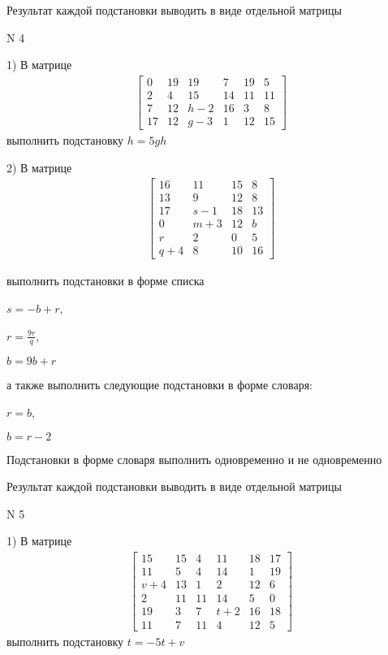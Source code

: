 \documentclass[11pt]{report}
\begin{document}
    Результат каждой подстановки выводить в виде отдельной матрицы

\newpage
N 4


    1) В матрице
\begin{align*}
\left[\begin{matrix}0 & 19 & 19 & 7 & 19 & 5\\2 & 4 & 15 & 14 & 11 & 11\\7 & 12 & h - 2 & 16 & 3 & 8\\17 & 12 & g - 3 & 1 & 12 & 15\end{matrix}\right]
\end{align*}
выполнить подстановку $h=5 g h$


    2) В матрице
\begin{align*}
\left[\begin{matrix}16 & 11 & 15 & 8\\13 & 9 & 12 & 8\\17 & s - 1 & 18 & 13\\0 & m + 3 & 12 & b\\r & 2 & 0 & 5\\q + 4 & 8 & 10 & 16\end{matrix}\right]
\end{align*}

выполнить подстановки в форме списка

$s=- b + r$,

$r=\frac{9 r}{q}$,

$b=9 b + r$

а также выполнить следующие подстановки в форме словаря:

$r=b$,

$b=r - 2$


    Подстановки в форме словаря выполнить одновременно и не одновременно


    Результат каждой подстановки выводить в виде отдельной матрицы

\newpage
N 5


    1) В матрице
\begin{align*}
\left[\begin{matrix}15 & 15 & 4 & 11 & 18 & 17\\11 & 5 & 4 & 14 & 1 & 19\\v + 4 & 13 & 1 & 2 & 12 & 6\\2 & 11 & 11 & 14 & 5 & 0\\19 & 3 & 7 & t + 2 & 16 & 18\\11 & 7 & 11 & 4 & 12 & 5\end{matrix}\right]
\end{align*}
выполнить подстановку $t=- 5 t + v$
\end{document}
